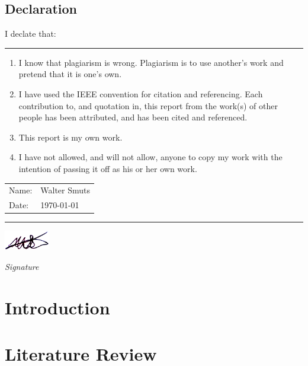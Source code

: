 \documentclass[12pt, twoside, openright]{report}
\begin{document}
\newpage
\section*{Declaration}

I declate that:
\vspace{3mm}
\hrule
\begin{enumerate}
\item
I know that plagiarism is wrong. Plagiarism is to use another’s work and
pretend that it is one’s own.
\item
I have used the IEEE convention for citation and referencing. Each contribution
to, and quotation in, this report from the work(s) of other people has been
attributed, and has been cited and referenced.
\item
This report is my own work.
\item
I have not allowed, and will not allow, anyone to copy my work with the
intention of passing it off as his or her own work.
\end{enumerate}

\begin{tabular}{ l l }
 Name: &  Walter Smuts\\
 Date: & \today
\end{tabular}
\vspace{3mm}
\hrule
\vspace{3mm}
\includegraphics[width=2cm]{Signature.png}
\par {\it Signature}

\tableofcontents


\chapter{Introduction}
\setcounter{page}{1}


\chapter{Literature Review}

\end{document}
